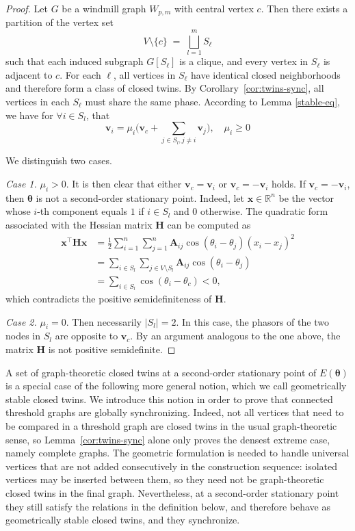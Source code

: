 \documentclass[11pt,reqno]{amsart}
\theoremstyle{definition}
\begin{document}
\begin{proof}
Let $G$ be a windmill graph $W_{p,m}$ with central vertex $c$.
Then there exists a partition of the vertex set
\[
V \setminus \{c\} \;=\; \bigsqcup_{l=1}^m S_\ell
\]
such that each induced subgraph $G[S_\ell]$ is a clique, and every vertex in $S_\ell$
is adjacent to $c$.
For each $\ell$, all vertices in $S_\ell$ have identical closed neighborhoods and
therefore form a class of closed twins.
By Corollary~\ref{cor:twins-sync}, all vertices in each $S_\ell$ must share the same phase.
According to Lemma \ref{stable-eq}, we have for $\forall i \in S_l$, that $$\boldsymbol{v}_i =\mu_i\big( \boldsymbol{v}_c+\sum_{j\in S_l,j\neq i}\boldsymbol{v}_j\big),\quad \mu_i\geq 0$$

We distinguish two cases.

\emph{Case 1.} $\mu_i>0$. It is then clear that either $\boldsymbol{v}_c = \boldsymbol{v}_i$ or $\boldsymbol{v}_c = -\boldsymbol{v}_i$ holds.
If $\boldsymbol{v}_c = -\boldsymbol{v}_i$, then $\boldsymbol{\theta}$ is not a second-order stationary point.
Indeed, let $\boldsymbol{x}\in\mathbb{R}^n$ be the vector whose $i$-th component equals $1$ if $i\in S_l$ and $0$ otherwise.
The quadratic form associated with the Hessian matrix $\boldsymbol{H}$ can be computed as
$$
\begin{aligned}
\boldsymbol{x}^\top \boldsymbol{H}\boldsymbol{x} & =\frac{1}{2}\sum_{i=1}^n\sum_{j=1}^n \boldsymbol{A}_{ij}\cos(\theta_i-\theta_j)(x_i-x_j)^2\\
& =
\sum_{i\in S_l}\sum_{j\in V\setminus S_l} \boldsymbol A_{ij}\cos(\theta_i-\theta_j)\\
&=
\sum_{i\in S_l}\cos(\theta_i-\theta_c)
<0,
\end{aligned}
$$
which contradicts the positive semidefiniteness of $\boldsymbol{H}$.

\emph{Case 2.} $\mu_i=0$.
Then necessarily $|S_l|=2$.
In this case, the phasors of the two nodes in $S_l$ are opposite to $\boldsymbol{v}_c$.
By an argument analogous to the one above, the matrix $\boldsymbol{H}$ is not positive semidefinite.
\end{proof}

A set of graph-theoretic closed twins at a second-order stationary point of $E(\boldsymbol{\theta})$ is a special case of the following more general notion, which we call geometrically stable closed twins. We introduce this notion in order to prove that connected threshold graphs are globally synchronizing. Indeed, not all vertices that need to be compared in a threshold graph are closed twins in the usual graph-theoretic sense, so Lemma~\ref{cor:twins-sync} alone only proves the densest extreme case, namely complete graphs. The geometric formulation is needed to handle universal vertices that are not added consecutively in the construction sequence: isolated vertices may be inserted between them, so they need not be graph-theoretic closed twins in the final graph. Nevertheless, at a second-order stationary point they still satisfy the relations in the definition below, and therefore behave as geometrically stable closed twins, and they synchronize.
\end{document}

